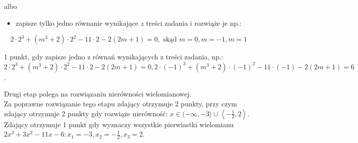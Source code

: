 \documentclass[10pt]{article}
\begin{document}
albo

\begin{itemize}
  \item zapisze tylko jedno równanie wynikające $z$ treści zadania i rozwiąże je np.:
\end{itemize}

$$
2 \cdot 2^{3}+\left(m^{3}+2\right) \cdot 2^{2}-11 \cdot 2-2(2 m+1)=0, \text { skąd } m=0, m=-1, m=1
$$

1 punkt, gdy zapisze jedno z równań wynikających z treści zadania, np.: $2 \cdot 2^{3}+\left(m^{3}+2\right) \cdot 2^{2}-11 \cdot 2-2(2 m+1)=0,2 \cdot(-1)^{3}+\left(m^{3}+2\right) \cdot(-1)^{2}-11 \cdot(-1)-2(2 m+1)=6$.

Drugi etap polega na rozwiązaniu nierówności wielomianowej.\\
Za poprawne rozwiązanie tego etapu zdający otrzymuje 2 punkty, przy czym zdający otrzymuje 2 punkty gdy rozwiąże nierówność: $x \in(-\infty,-3\rangle \cup\left\langle-\frac{1}{2}, 2\right\rangle$.\\
Zdający otrzymuje 1 punkt gdy wyznaczy wszystkie pierwiastki wielomianu $2 x^{3}+3 x^{2}-11 x-6: x_{1}=-3, x_{2}=-\frac{1}{2}, x_{3}=2$.
\end{document}
